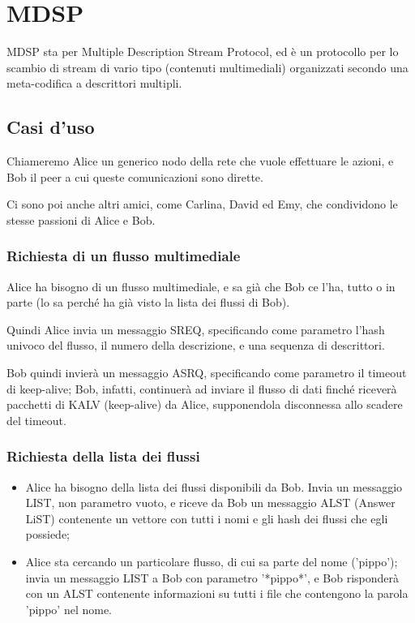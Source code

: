 \section{MDSP}


MDSP sta per Multiple Description Stream Protocol, ed è un protocollo per lo scambio di stream di vario tipo (contenuti multimediali) organizzati secondo una meta-codifica a descrittori multipli.


\subsection{Casi d'uso}


Chiameremo Alice un generico nodo della rete che vuole effettuare le azioni, e Bob il peer a cui queste comunicazioni sono dirette.

Ci sono poi anche altri amici, come Carlina, David ed Emy, che condividono le stesse passioni di Alice e Bob.


\subsubsection{Richiesta di un flusso multimediale}
%

Alice ha bisogno di un flusso multimediale, e sa già che Bob ce l'ha, tutto o in parte (lo sa perché ha già visto la lista dei flussi di Bob).



Quindi Alice invia un messaggio SREQ, specificando come parametro l'hash univoco del flusso, il numero della descrizione, e una sequenza di descrittori.



Bob quindi invierà un messaggio ASRQ, specificando come parametro il timeout di keep-alive; Bob, infatti, continuerà ad inviare il flusso di dati finché riceverà pacchetti di KALV (keep-alive) da Alice, supponendola disconnessa allo scadere del timeout. 






\subsubsection{Richiesta della lista dei flussi}
%

\begin{itemize}
\item Alice ha bisogno della lista dei flussi disponibili da Bob. Invia un messaggio LIST, non parametro vuoto, e riceve da Bob un messaggio ALST (Answer LiST) contenente un vettore con tutti i nomi e gli hash dei flussi che egli possiede;

\item Alice sta cercando un particolare flusso, di cui sa parte del nome ('pippo'); invia un messaggio LIST a Bob con parametro '*pippo*', e Bob risponderà con un ALST contenente informazioni su tutti i file che contengono la parola 'pippo' nel nome.
\end{itemize}




